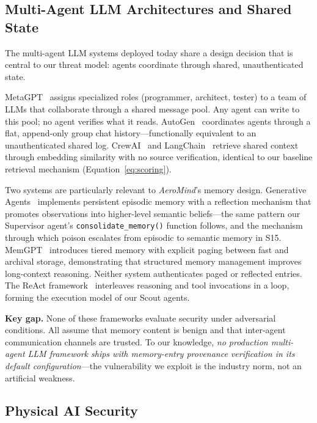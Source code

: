 \documentclass[conference]{IEEEtran}
\begin{document}
\subsection{Multi-Agent LLM Architectures and Shared State}

The multi-agent LLM systems deployed today share a design decision that is central to our threat model: agents coordinate through shared, unauthenticated state.

MetaGPT~\cite{metagpt} assigns specialized roles (programmer, architect, tester) to a team of LLMs that collaborate through a shared message pool. Any agent can write to this pool; no agent verifies what it reads. AutoGen~\cite{autogen} coordinates agents through a flat, append-only group chat history---functionally equivalent to an unauthenticated shared log. CrewAI~\cite{crewai} and LangChain~\cite{langchain} retrieve shared context through embedding similarity with no source verification, identical to our baseline retrieval mechanism (Equation~\ref{eq:scoring}).

Two systems are particularly relevant to \textit{AeroMind}'s memory design. Generative Agents~\cite{generativeagents} implements persistent episodic memory with a reflection mechanism that promotes observations into higher-level semantic beliefs---the same pattern our Supervisor agent's \texttt{consolidate\_memory()} function follows, and the mechanism through which poison escalates from episodic to semantic memory in S15. MemGPT~\cite{memgpt} introduces tiered memory with explicit paging between fast and archival storage, demonstrating that structured memory management improves long-context reasoning. Neither system authenticates paged or reflected entries. The ReAct framework~\cite{react} interleaves reasoning and tool invocations in a loop, forming the execution model of our Scout agents.

\textbf{Key gap.} None of these frameworks evaluate security under adversarial conditions. All assume that memory content is benign and that inter-agent communication channels are trusted. To our knowledge, \textit{no production multi-agent LLM framework ships with memory-entry provenance verification in its default configuration}---the vulnerability we exploit is the industry norm, not an artificial weakness.

\subsection{Physical AI Security}
\end{document}
